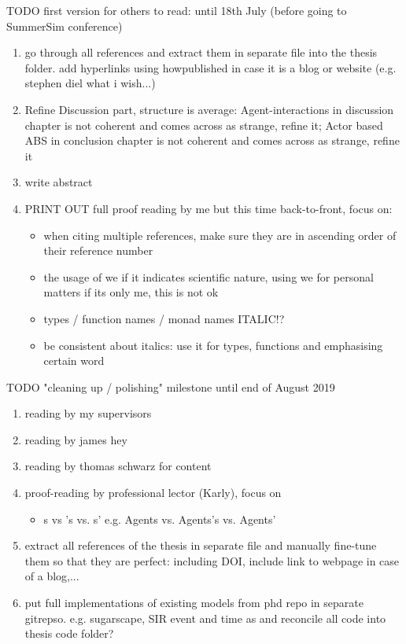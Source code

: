 \documentclass[oneside]{book}
\begin{document}
\clearpage

TODO first version for others to read: until 18th July (before going to SummerSim conference)
\begin{enumerate}
	\item go through all references and extract them in separate file into the thesis folder. add hyperlinks using howpublished in case it is a blog or website (e.g. stephen diel what i wish...)
	
	\item Refine Discussion part, structure is average: Agent-interactions in discussion chapter is not coherent and comes across as strange, refine it; Actor based ABS in conclusion chapter is not coherent and comes across as strange, refine it

	\item write abstract

	\item PRINT OUT full proof reading by me but this time back-to-front, focus on:
	\begin{itemize}
		\item when citing multiple references, make sure they are in ascending order of their reference number	
		\item the usage of we if it indicates scientific nature, using we for personal matters if its only me, this is not ok	
		\item types / function names / monad names ITALIC!?	
		\item be consistent about italics: use it for types, functions and emphasising certain word
	\end{itemize}
\end{enumerate}

TODO "cleaning up / polishing" milestone until end of August 2019
\begin{enumerate}
	\item reading by my supervisors

	\item reading by james hey
	
	\item reading by thomas schwarz for content
		
	\item proof-reading by professional lector (Karly), focus on 
	\begin{itemize}
		\item s vs 's vs. s' e.g. Agents vs. Agents's vs. Agents'
	\end{itemize}
	
	\item extract all references of the thesis in separate file and manually fine-tune them so that they are perfect: including DOI, include link to webpage in case of a blog,...
	
	\item put full implementations of existing models from phd repo in separate gitrepso. e.g. sugarscape, SIR event and time as and reconcile all code into thesis code folder?
\end{enumerate}
\end{document}
